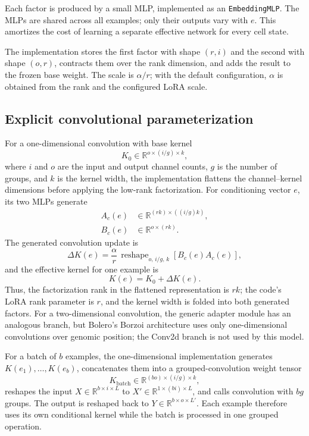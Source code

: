 \documentclass[11pt]{article}
\newcommand{\code}[1]{\texttt{\small #1}}
\newcommand{\condvec}{e}
\begin{document}
Each factor is produced by a small MLP, implemented as an \code{EmbeddingMLP}. The MLPs
are shared across all examples; only their outputs vary with $\condvec$. This amortizes
the cost of learning a separate effective network for every cell state.

The implementation stores the first factor with shape $(r,i)$ and the second with shape
$(o,r)$, contracts them over the rank dimension, and adds the result to the frozen base
weight. The scale is $\alpha/r$; with the default configuration, $\alpha$ is obtained from
the rank and the configured LoRA scale.

\subsection{Explicit convolutional parameterization}

For a one-dimensional convolution with base kernel
\[
K_0 \in \mathbb{R}^{o\times(i/g)\times k},
\]
where $i$ and $o$ are the input and output channel counts, $g$ is the number of groups,
and $k$ is the kernel width, the implementation flattens the channel--kernel dimensions
before applying the low-rank factorization. For conditioning vector $\condvec$, its two
MLPs generate
\begin{align}
A_c(\condvec) &\in \mathbb{R}^{(rk)\times((i/g)k)},\\
B_c(\condvec) &\in \mathbb{R}^{o\times(rk)}.
\end{align}
The generated convolution update is
\[
\Delta K(\condvec) = \frac{\alpha}{r}\,
\operatorname{reshape}_{o,\,i/g,\,k}\!\left[
B_c(\condvec)A_c(\condvec)\right],
\]
and the effective kernel for one example is
\[
K(\condvec) = K_0 + \Delta K(\condvec).
\]
Thus, the factorization rank in the flattened representation is $rk$; the code's LoRA
rank parameter is $r$, and the kernel width is folded into both generated factors. For a
two-dimensional convolution, the generic adapter module has an analogous branch, but
Bolero's Borzoi architecture uses only one-dimensional convolutions over genomic position;
the Conv2d branch is not used by this model.

For a batch of $b$ examples, the one-dimensional implementation generates
$K(\condvec_1),\ldots,K(\condvec_b)$, concatenates them into a grouped-convolution weight
tensor
\[
K_{\mathrm{batch}}\in\mathbb{R}^{(bo)\times(i/g)\times k},
\]
reshapes the input $X\in\mathbb{R}^{b\times i\times L}$ to
$X'\in\mathbb{R}^{1\times(bi)\times L}$, and calls convolution with $bg$ groups. The
output is reshaped back to $Y\in\mathbb{R}^{b\times o\times L'}$. Each example therefore
uses its own conditional kernel while the batch is processed in one grouped operation.
\end{document}

